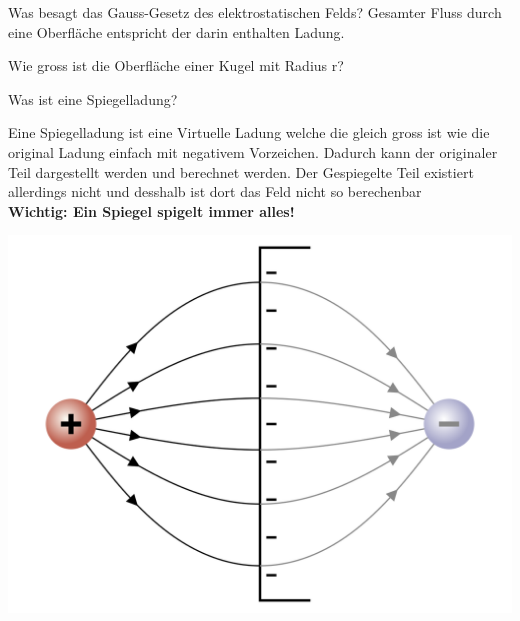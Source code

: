 \begin{lk}{Was besagt das Gauss-Gesetz des elektrostatischen Felds?}
	Gesamter Fluss durch eine Oberfläche entspricht der darin enthalten Ladung.
\end{lk}

\begin{lk}{Wie gross ist die Oberfläche einer Kugel mit Radius r?}
\end{lk}


\begin{lk}{Was ist eine Spiegelladung?}
	\begin{minipage}{0.7\textwidth}
		Eine Spiegelladung ist eine Virtuelle Ladung welche die gleich gross ist wie die original Ladung einfach mit negativem Vorzeichen. Dadurch kann der originaler Teil dargestellt werden und berechnet werden. Der Gespiegelte Teil existiert allerdings nicht und desshalb ist dort das Feld nicht so berechenbar\\
		\textbf{Wichtig: Ein Spiegel spigelt immer alles!}
	\end{minipage}
	\begin{minipage}{0.29\textwidth}
			\includegraphics[width=\textwidth]{pics/ES_Spiegelladung.png} %
	\end{minipage}
\end{lk}

